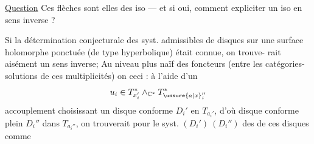 \uline{Question} Ces flèches sont elles des iso
--- et si oui, comment expliciter un
iso en sens inverse ? 

Si la détermination conjecturale des
syst. admissibles de disques sur une
surface holomorphe  ponctuée (de type
hyperbolique) était connue, on trouve-
rait aisément  un sens
inverse; Au niveau plus naïf des
foncteurs (entre les catégories-solutions
de ces multiplicités) on 
ceci : à l'aide d'un 
\[
u_i\in T_{x_i'}^*\wedge_{\mathbb C^*}T_{\unsure{a|x}_i''}^*
\]
  accouplement 
choisissant un  disque conforme
$D_i'$ en $T_{a_i'}$,  d'où disque
conforme plein $D_i''$ dans $T_{a_i''}$, on
trouverait  pour le syst. $(D_i')\ (D_i'')$
des  de ces disques comme
